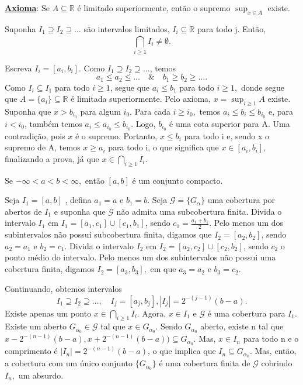 \documentclass[measure_theory.tex]{subfiles}
\begin{document}
\underline{\textbf{Axioma}}: Se \(A\subseteq \mathbb{R}\) é limitado superiormente, então o supremo \(\sup_{x\in A}\) existe.

\begin{prop*}
	Suponha \(I_{1}\supseteq I_{2}\supseteq \dotsc \) são intervalos limitados, \(I_{i}\subseteq \mathbb{R}\) para todo j. Então,
	\[
		\bigcap_{i\geq 1}^{}I_{i}\neq\emptyset.
	\]
\end{prop*}
\begin{proof*}
	Escreva \(I_{i} = [a_{i}, b_{i}]\). Como \(I_{1}\supseteq I_{2}\supseteq \dotsc \), temos
	\[
		a_{1} \leq a_{2} \leq \dotsc \quad\&\quad b_{1} \geq b_{2} \geq  \dotsc .
	\]
	Como \(I_{i}\subseteq I_{1}\) para todo \(i \geq 1\), segue que \(a_{i} \leq b_{1}\) para todo \(i\geq 1,\) donde segue que \(A = \{a_{i}\}\subseteq \mathbb{R}\) é limitada superiormente.
	Pelo axioma, \(x = \sup_{i\geq 1}A\) existe. Suponha que \(x > b_{i_{0}}\) para algum \(i_{0}\). Para cada \(i \geq i_{0},\) temos \(a_{i}\leq b_{i} \leq b_{i_{0}}\) e, para
	\(i < i_{0}\), também temos \(a_{i}\leq a_{i_{0}}\leq b_{i_{0}}\). Logo, \(b_{i_{0}}\) é uma cota superior para A. Uma contradição, pois \(x\) é o supremo. Portanto,
	\(x\leq b_{i}\) para todo i e, sendo x o supremo de A, temos \(x \geq a_{i}\) para todo i, o que significa que \(x\in [a_{i}, b_{i}]\), finalizando a prova, já que \(x\in \bigcap_{i\geq 1}^{}I_{i}.\) \qedsymbol
\end{proof*}
\begin{prop*}
	Se \(-\infty< a < b < \infty,\) então \([a, b]\) é um conjunto compacto.
\end{prop*}
\begin{proof*}
	Seja \(I_{1} = [a, b]\) , defina \(a_{1} = a \) e \(b_{1} = b\). Seja \(\mathcal{G} = \{G_{\alpha }\}\) uma cobertura por abertos de \(I_{1}\) e suponha
	que \(\mathcal{G}\) não admita uma subcobertura finita. Divida o intervalo \(I_{1}\) em \(I_{1} = [a_{1}, c_{1}]\cup [c_{1}, b_{1}]\), sendo \(c_{1} = \frac{a_{1}+b_{1}}{2}\). Pelo menos
	um dos subintervalos não possui subcobertura finita, digamos que \(I_{2} = [a_{2}, b_{2}]\), sendo \(a_{2} = a_{1}\) e \(b_{2} = c_{1}.\) Divida o intervalo \(I_{2}\) em \(I_{2} = [a_{2}, c_{2}]\cup [c_{2}, b_{2}]\), sendo
	\(c_{2}\) o ponto médio do intervalo. Pelo menos um dos subintervalos não possui uma cobertura finita, digamos \(I_{2} = [a_{3}, b_{3}],\) em que \(a_{3} = a_{2}\) e \(b_{3} = c_{2}.\)

	Continuando, obtemos intervalos
	\[
		I_{1}\supseteq I_{2}\supseteq \dotsc ,\quad I_{j} = [a_{j}, b_{j}], |I_{j}| = 2^{-(j-1)}(b-a).
	\]
	Existe apenas um ponto \(x\in \bigcap_{i\geq 1}^{}I_{i}\). Agora, \(x\in I_{1}\) e \(\mathcal{G}\) é uma cobertura para \(I_{1}.\) Existe um aberto \(G_{\alpha_{0}}\in \mathcal{G}\) tal que
	\(x\in G_{\alpha_{0}}.\) Sendo \(G_{\alpha_{0}}\) aberto, existe n tal que \(x - 2^{-(n-1)}(b-a), x+2^{-(n-1)}(b-a))\subseteq G_{\alpha_{0}}.\) Mas, \(x\in I_{n}\) para todo n e o comprimento
	é \(|I_{n}| = 2^{-(n-1)}(b-a)\), o que implica que \(I_{n}\subseteq G_{\alpha_{0}}\). Mas, então, a cobertura com um único conjunto \(\{G_{\alpha_{0}}\} \) é uma cobertura finita de \(\mathcal{G}\) cobrindo
	\(I_{n},\) um absurdo. \qedsymbol
\end{proof*}
\end{document}
